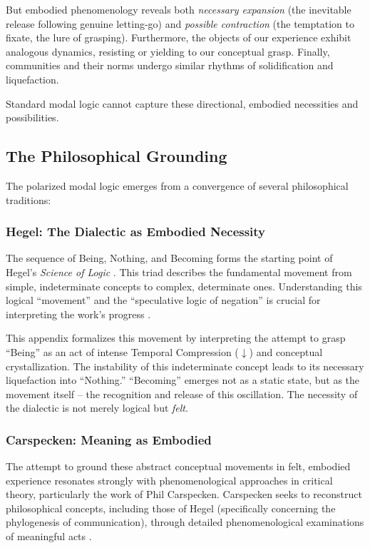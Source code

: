 \documentclass[12pt]{book}
\begin{document}
But embodied phenomenology reveals both \textit{necessary expansion} (the inevitable release following genuine letting-go) and \textit{possible contraction} (the temptation to fixate, the lure of grasping). Furthermore, the objects of our experience exhibit analogous dynamics, resisting or yielding to our conceptual grasp. Finally, communities and their norms undergo similar rhythms of solidification and liquefaction.

Standard modal logic cannot capture these directional, embodied necessities and possibilities.

\subsection{The Philosophical Grounding}

The polarized modal logic emerges from a convergence of several philosophical traditions:

\subsubsection{Hegel: The Dialectic as Embodied Necessity}

The sequence of Being, Nothing, and Becoming forms the starting point of Hegel's \textit{Science of Logic} \parencite{inwood1992hegel, Hegel1830Logic}. This triad describes the fundamental movement from simple, indeterminate concepts to complex, determinate ones. Understanding this logical ``movement'' and the ``speculative logic of negation'' is crucial for interpreting the work's progress \parencite[p. 38]{Pippin:2019aa}.

This appendix formalizes this movement by interpreting the attempt to grasp ``Being'' as an act of intense Temporal Compression ($\downarrow$) and conceptual crystallization. The instability of this indeterminate concept leads to its necessary liquefaction into ``Nothing.'' ``Becoming'' emerges not as a static state, but as the movement itself -- the recognition and release of this oscillation. The necessity of the dialectic is not merely logical but \textit{felt}.

\subsubsection{Carspecken: Meaning as Embodied}

The attempt to ground these abstract conceptual movements in felt, embodied experience resonates strongly with phenomenological approaches in critical theory, particularly the work of Phil Carspecken. Carspecken seeks to reconstruct philosophical concepts, including those of Hegel (specifically concerning the phylogenesis of communication), through detailed phenomenological examinations of meaningful acts \parencite{Carspecken1999}.
\end{document}

